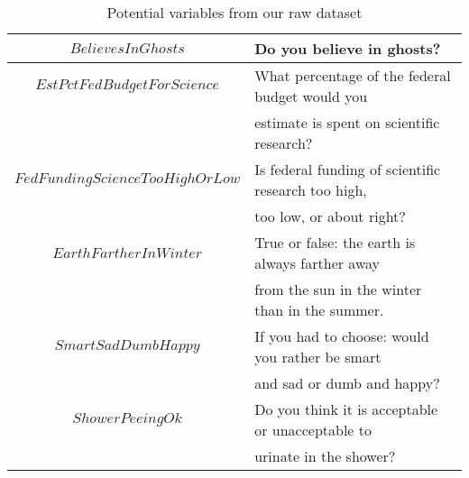 \begin{table}[h]
\begin{tabular}{|c|l|}
        \hline
        $BelievesInGhosts$ & Do you believe in ghosts?\\
        \hline
        $EstPctFedBudgetForScience$ & What percentage of the federal budget would you\\
        & estimate is spent on scientific research?\\
        \hline
        $FedFundingScienceTooHighOrLow$ & Is federal funding of scientific research too high,\\
        & too low, or about right?\\
        \hline
        $EarthFartherInWinter$ & True or false: the earth is always farther away\\
        & from the sun in the winter than in the summer.\\
        \hline
        $SmartSadDumbHappy$ & If you had to choose: would you rather be smart\\
        & and sad or dumb and happy?\\
        \hline
        $ShowerPeeingOk$ & Do you think it is acceptable or unacceptable to\\
        & urinate in the shower?\\
        \hline
    \end{tabular}
    \caption{Potential variables from our raw dataset}
    \label{tab:data_raw}
\end{table}